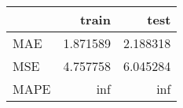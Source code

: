\begin{tabular}{lrr}
\toprule
{} &     train &      test \\
\midrule
MAE  &  1.871589 &  2.188318 \\
MSE  &  4.757758 &  6.045284 \\
MAPE &       inf &       inf \\
\bottomrule
\end{tabular}
